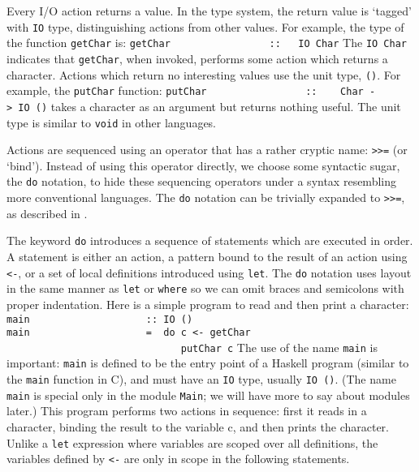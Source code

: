 Every I/O action returns a value.  In the type system, the return value is
`tagged' with \mbox{\tt IO} type, distinguishing actions from other
values.  For example, the type 
of the function \mbox{\tt getChar} is:
\bprog
\mbox{\tt getChar\ \ \ \ \ \ \ \ \ \ \ \ \ \ \ \ \ ::\ \ \ IO\ Char}
\eprog
The \mbox{\tt IO\ Char} indicates that \mbox{\tt getChar}, when invoked, performs
some action which returns a character.  Actions which return no
interesting values use the unit type, \mbox{\tt ()}.  For example, the
\mbox{\tt putChar} function: 
\bprog
\mbox{\tt putChar\ \ \ \ \ \ \ \ \ \ \ \ \ \ \ \ \ ::\ \ \ \ Char\ ->\ IO\ ()}
\eprog
takes a character as an argument but returns nothing useful. 
The unit type is similar to \mbox{\tt void} in other languages.

Actions are sequenced using an operator that has a
rather cryptic name: \mbox{\tt >>=} (or `bind').   Instead of using this
operator directly, we choose some syntactic sugar, the \mbox{\tt do}
notation,  to hide these sequencing operators under a syntax resembling
more conventional languages.
The \mbox{\tt do} notation can be trivially expanded to \mbox{\tt >>=}, 
as described in .

The keyword \mbox{\tt do} introduces a sequence of statements
which are executed in order.  A statement is either an action,
a pattern bound to the result of an action using \mbox{\tt <-}, or
a set of local definitions introduced using \mbox{\tt let}.  The \mbox{\tt do} notation
uses layout in the same manner as \mbox{\tt let} or \mbox{\tt where} so we
can omit braces and semicolons with proper indentation.  Here is a
simple program to read and then print a character:
\bprog
\mbox{\tt main\ \ \ \ \ \ \ \ \ \ \ \ \ \ \ \ \ \ \ \ ::\ IO\ ()}\\
\mbox{\tt main\ \ \ \ \ \ \ \ \ \ \ \ \ \ \ \ \ \ \ \ =\ \ do\ c\ <-\ getChar}\\
\mbox{\tt \ \ \ \ \ \ \ \ \ \ \ \ \ \ \ \ \ \ \ \ \ \ \ \ \ \ \ \ \ \ putChar\ c}
\eprog
The use of the name \mbox{\tt main} is important: \mbox{\tt main} 
is defined to be the entry point of a Haskell program (similar
to the \mbox{\tt main} function in C), and
must have an \mbox{\tt IO} type, usually \mbox{\tt IO\ ()}.  (The name \mbox{\tt main} is special
only in the module \mbox{\tt Main}; we will have more to say about modules
later.)  This 
program performs two actions in 
sequence: first it reads in a character, binding the result to the
variable c, and then prints the character.  Unlike a \mbox{\tt let} expression
where variables are scoped over all definitions, the
variables defined by \mbox{\tt <-} are only in scope in the following statements.

